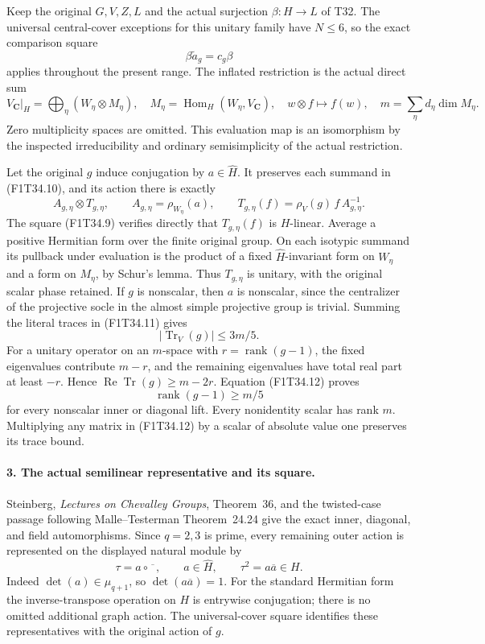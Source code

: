 Keep the original \(G,V,Z,L\) and the actual
surjection \(\beta:H\to L\) of T32. The universal
central-cover exceptions for this unitary family have
\(N\le6\), so the exact comparison square
\[
             \beta\widetilde a_g=c_g\beta
 \tag{F1T34.9}
\]
applies throughout the present range. The inflated
restriction is the actual direct sum
\[
 V_{\mathbf C}|_H=\bigoplus_\eta(W_\eta\otimes M_\eta),
 \quad M_\eta=\operatorname{Hom}_H(W_\eta,V_{\mathbf C}),
 \quad w\otimes f\longmapsto f(w),
 \quad m=\sum_\eta d_\eta\dim M_\eta.
 \tag{F1T34.10}
\]
Zero multiplicity spaces are omitted. This evaluation
map is an isomorphism by the inspected irreducibility
and ordinary semisimplicity of the actual restriction.

Let the original \(g\) induce conjugation by
\(a\in\widehat H\). It preserves each summand in
(F1T34.10), and its action there is exactly
\[
 A_{g,\eta}\otimes T_{g,\eta},\qquad
 A_{g,\eta}=\rho_{W_\eta}(a),\qquad
 T_{g,\eta}(f)=\rho_V(g)\,f\,A_{g,\eta}^{-1}.
 \tag{F1T34.11}
\]
The square (F1T34.9) verifies directly that
\(T_{g,\eta}(f)\) is \(H\)-linear. Average a positive
Hermitian form over the finite original group. On
each isotypic summand its pullback under evaluation is
the product of a fixed \(\widehat H\)-invariant form
on \(W_\eta\) and a form on \(M_\eta\), by Schur's
lemma. Thus \(T_{g,\eta}\) is unitary, with the
original scalar phase retained. If \(g\) is
nonscalar, then \(a\) is nonscalar, since the
centralizer of the projective socle in the almost
simple projective group is trivial. Summing the
literal traces in (F1T34.11) gives
\[
                   |\operatorname{Tr}_V(g)|\le3m/5.
 \tag{F1T34.12}
\]
For a unitary operator on an \(m\)-space with
\(r=\operatorname{rank}(g-1)\), the fixed eigenvalues
contribute \(m-r\), and the remaining eigenvalues
have total real part at least \(-r\). Hence
\(\operatorname{Re}\operatorname{Tr}(g)\ge m-2r\).
Equation (F1T34.12) proves
\[
                   \operatorname{rank}(g-1)\ge m/5
 \tag{F1T34.13}
\]
for every nonscalar inner or diagonal lift. Every
nonidentity scalar has rank \(m\). Multiplying any
matrix in (F1T34.12) by a scalar of absolute value
one preserves its trace bound.

\paragraph{3. The actual semilinear representative and its square.}
Steinberg, \emph{Lectures on Chevalley Groups},
Theorem~36, and the twisted-case passage following
Malle--Testerman Theorem~24.24 give the exact
inner, diagonal, and field automorphisms. Since
\(q=2,3\) is prime, every remaining outer action
is represented on the displayed natural module by
\[
       \tau=a\circ\overline{\phantom{x}},
       \qquad a\in\widehat H,
       \qquad \tau^2=a\overline a\in H.
 \tag{F1T34.14}
\]
Indeed \(\det(a)\in\mu_{q+1}\), so
\(\det(a\overline a)=1\). For the standard
Hermitian form the inverse-transpose operation on
\(H\) is entrywise conjugation; there is no omitted
additional graph action. The universal-cover square
identifies these representatives with the original
action of \(g\).

